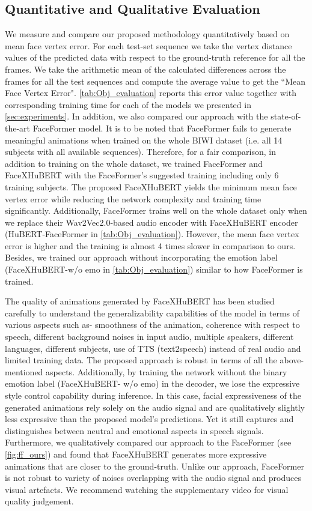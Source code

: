 \documentclass[10pt,twocolumn,letterpaper]{article}
\begin{document}
\subsection{Quantitative and Qualitative Evaluation}
\label{sec:eval}
We measure and compare our proposed methodology quantitatively based on mean face vertex error. For each test-set sequence we take the vertex distance values of the predicted data with respect to the ground-truth reference for all the frames. We take the arithmetic mean of the calculated differences across the frames for all the test sequences and compute the average value to get the ``Mean Face Vertex Error". \cref{tab:Obj_evaluation} reports this error value together with corresponding training time for each of the models we presented in \cref{sec:experiments}. In addition, we also compared our approach with the state-of-the-art FaceFormer model. It is to be noted that FaceFormer fails to generate meaningful animations when trained on the whole BIWI dataset (i.e. all 14 subjects with all available sequences). Therefore, for a fair comparison, in addition to training on the whole dataset, we trained FaceFormer and FaceXHuBERT with the FaceFormer's suggested training including only 6 training subjects. The proposed FaceXHuBERT yields the minimum mean face vertex error while reducing the network complexity and training time significantly. Additionally, FaceFormer trains well on the whole dataset only when we replace their Wav2Vec2.0-based audio encoder with FaceXHuBERT encoder (HuBERT-FaceFormer in \cref{tab:Obj_evaluation}). However, the mean face vertex error is higher and the training is almost 4 times slower in comparison to ours. Besides, we trained our approach without incorporating the emotion label (FaceXHuBERT-w/o emo in \cref{tab:Obj_evaluation}) similar to how FaceFormer is trained.

The quality of animations generated by FaceXHuBERT has been studied carefully to understand the generalizability capabilities of the model in terms of various aspects such as- smoothness of the animation, coherence with respect to speech, different background noises in input audio, multiple speakers, different languages, different subjects, use of TTS (text2speech) instead of real audio and limited training data. The proposed approach is robust in terms of all the above-mentioned aspects. Additionally, by training the network without the binary emotion label (FaceXHuBERT- w/o emo) in the decoder, we lose the expressive style control capability during inference. In this case, facial expressiveness of the generated animations rely solely on the audio signal and are qualitatively slightly less expressive than the proposed model's predictions. Yet it still captures and distinguishes between neutral and emotional aspects in speech signals.  Furthermore, we qualitatively compared our approach to the FaceFormer (see \cref{fig:ff_ours}) and found that FaceXHuBERT generates more expressive animations that are closer to the ground-truth. Unlike our approach, FaceFormer is not robust to variety of noises overlapping with the audio signal and produces visual artefacts. We recommend watching the supplementary video for visual quality judgement. 
\end{document}
